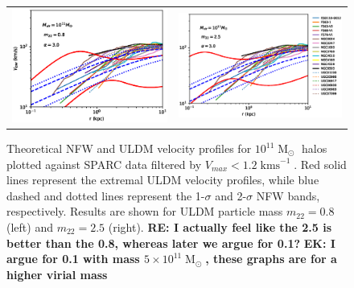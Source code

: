 \documentclass[a4paper,11pt]{article}
\newcommand{\ek}[1]{{{\bf \color{red} EK: #1}}}
\newcommand{\re}[1]{{{\bf \color{green} RE: #1}}}
\begin{document}
\begin{figure}
\begin{tabular}{cc}
{\includegraphics[scale = 0.65, trim={2.5cm 2.5cm 2.1cm 0.5cm}]{pics/v_11_8_3_paper.eps}} &
{\includegraphics[scale = 0.65, trim={2.1cm 2.5cm 0cm 0.5cm}]{pics/v_11_25_3_paper.eps}}
\end{tabular}
\caption{Theoretical NFW and ULDM velocity profiles for $10^{11}\operatorname{M}_{\odot}$ halos plotted against SPARC data filtered by $V_{max} < 1.2 \operatorname{kms}^{-1}$. Red solid lines represent the extremal ULDM velocity profiles, while  blue dashed and dotted lines represent the 1-$\sigma$ and 2-$\sigma$ NFW bands, respectively. Results are shown for ULDM particle mass $m_{22} = 0.8$ (left) and $m_{22} = 2.5 $ (right). \re{I actually feel like the 2.5 is better than the 0.8, whereas later we argue for 0.1?}\ek{I argue for 0.1 with mass $5\times10^{11}\operatorname{M}_{\odot}$, these graphs are for a higher virial mass} }\label{fig:velocity_11}
\end{figure}
\end{document}
